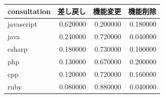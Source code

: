 \begin{tabular}{lrrr}
\toprule
consultation & 差し戻し & 機能変更 & 機能削除 \\
\midrule
javascript & 0.620000 & 0.200000 & 0.180000 \\
java & 0.240000 & 0.720000 & 0.040000 \\
csharp & 0.180000 & 0.730000 & 0.100000 \\
php & 0.130000 & 0.670000 & 0.200000 \\
cpp & 0.120000 & 0.720000 & 0.160000 \\
ruby & 0.080000 & 0.880000 & 0.040000 \\
\bottomrule
\end{tabular}
